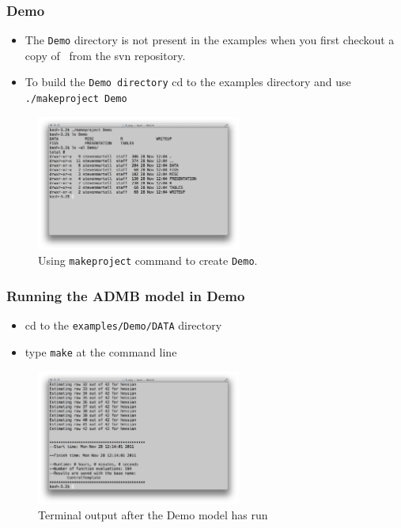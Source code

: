 \label{sub:demo_model}
\begin{frame}
	\frametitle{Demo} 
	\begin{itemize}
		\item The \texttt{Demo} directory is not present in the examples when you first checkout a copy of \iscam\ from the svn repository. 
		\item To build the \texttt{Demo directory} cd to the examples directory and use \texttt{./makeproject Demo} 
	\end{itemize}
	\begin{figure}
		[htbp] \centering 
		\includegraphics[height=1.75in]{screenCaptures/TermDemo.pdf} \caption{Using \texttt{makeproject} command to create \texttt{Demo}.} \label{fig:screenCaptures_TermDemo} 
	\end{figure}
\end{frame}
\begin{frame}
	\frametitle{Running the ADMB model in Demo} 
	\begin{itemize}
		\item cd to the \texttt{examples/Demo/DATA} directory 
		\item type \texttt{make} at the command line 
	\end{itemize}
	\begin{figure}
		[htbp] \centering 
		\includegraphics[height=1.75in]{screenCaptures/Term-catage.pdf} \caption{Terminal output after the Demo model has run} \label{fig:screenCaptures_Term-catage} 
	\end{figure}
\end{frame}

